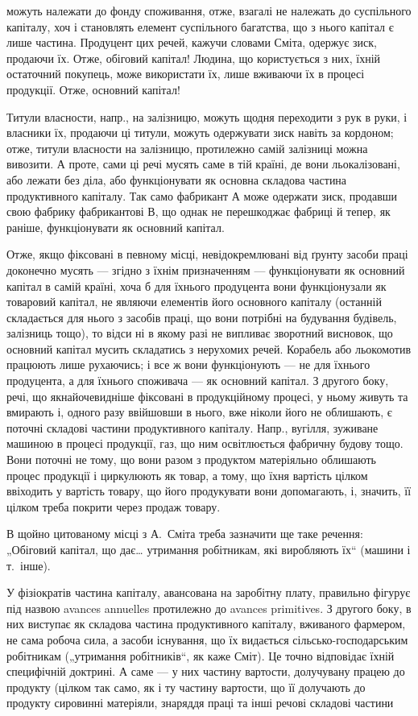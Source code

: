 \parcont{}  %
можуть належати до фонду споживання, отже, взагалі не належать до
суспільного капіталу, хоч і становлять елемент суспільного багатства, що
з нього капітал є лише частина. Продуцент цих речей, кажучи словами
Сміта, одержує зиск, продаючи їх. Отже, обіговий капітал! Людина, що
користується з них, їхній остаточний покупець, може використати їх, лише
вживаючи їх в процесі продукції. Отже, основний капітал!

Титули власности, напр., на залізницю, можуть щодня переходити з
рук в руки, і власники їх, продаючи ці титули, можуть одержувати зиск
навіть за кордоном; отже, титули власности на залізницю, протилежно
самій залізниці можна вивозити. А проте, сами ці речі мусять саме в тій
країні, де вони льокалізовані, або лежати без діла, або функціонувати як
основна складова частина продуктивного капіталу. Так само фабрикант
$А$ може одержати зиск, продавши свою фабрику фабрикантові $В$, що однак
не перешкоджає фабриці й тепер, як раніше, функціонувати як основний
капітал.

Отже, якщо фіксовані в певному місці, невідокремлювані від ґрунту
засоби праці доконечно мусять — згідно з їхнім призначенням — функціонувати
як основний капітал в самій країні, хоча б для їхнього продуцента
вони функціонузали як товаровий капітал, не являючи елементів його
основного капіталу (останній складається для нього з засобів праці, що
вони потрібні на будування будівель, залізниць тощо), то відси ні в
якому разі не випливає зворотний висновок, що основний капітал мусить
складатись з нерухомих речей. Корабель або льокомотив працюють
лише рухаючись; і все ж вони функціонують — не для їхнього продуцента,
а для їхнього споживача — як основний капітал. З другого боку,
речі, що якнайочевидніше фіксовані в продукційному процесі, у ньому
живуть та вмирають і, одного разу ввійшовши в нього, вже ніколи його
не облишають, є поточні складові частини продуктивного капіталу. Напр.,
вугілля, зуживане машиною в процесі продукції, газ, що ним освітлюється
фабричну будову тощо. Вони поточні не тому, що вони разом з
продуктом матеріяльно облишають процес продукції і циркулюють як
товар, а тому, що їхня вартість цілком ввіходить у вартість товару, що
його продукувати вони допомагають, і, значить, її цілком треба покрити
через продаж товару.

В щойно цитованому місці з А.~Сміта треба зазначити ще таке речення:
„Обіговий капітал, що дає\dots{} утримання робітникам, які виробляють
їх“ (машини і т.~інше).

У фізіократів частина капіталу, авансована на заробітну плату, правильно
фігурує під назвою avances annuelles протилежно до avances primitives.
З другого боку, в них виступає як складова частина продуктивного
капіталу, вживаного фармером, не сама робоча сила, а засоби існування,
що їх видається сільсько-господарським робітникам („утримання
робітників“, як каже Сміт). Це точно відповідає їхній специфічній доктрині.
А саме — у них частину вартости, долучувану працею до продукту
(цілком так само, як і ту частину вартости, що її долучають до продукту
сировинні матеріяли, знаряддя праці та інші речові складові частини
\parbreak{}  %
